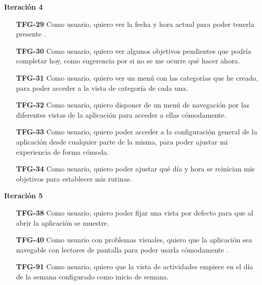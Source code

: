 \documentclass[10pt, a4paper]{aqademic}
\begin{document}
\textbf{Iteración 4}
\begin{itemize}[leftmargin=16mm]
	\item [\textbf{TFG-29}] Como usuario, quiero ver la fecha y hora actual para poder tenerla presente .

	\item [\textbf{TFG-30}] Como usuario, quiero ver algunos objetivos pendientes que podría completar hoy, como sugerencia por si no se me ocurre qué hacer ahora.
	
	\item [\textbf{TFG-31}] Como usuario, quiero ver un menú con las categorías que he creado, para poder acceder a la vista de categoría de cada una.
	
	\item [\textbf{TFG-32}] Como usuario, quiero disponer de un menú de navegación por las diferentes vistas de la aplicación para acceder a ellas cómodamente.
	
	\item [\textbf{TFG-33}] Como usuario, quiero poder acceder a la configuración general de la aplicación desde cualquier parte de la misma, para poder ajustar mi experiencia de forma cómoda.
	
	\item [\textbf{TFG-34}] Como usuario, quiero poder ajustar qué día y hora se reinician mis objetivos para establecer mis rutinas.
\end{itemize}

\textbf{Iteración 5}
\begin{itemize}[leftmargin=16mm]
	\item [\textbf{TFG-38}] Como usuario, quiero poder fijar una vista por defecto para que al abrir la aplicación se muestre.
	
	\item [\textbf{TFG-40}] Como usuario con problemas visuales, quiero que la aplicación sea navegable con lectores de pantalla para poder usarla cómodamente .
	
	\item [\textbf{TFG-91}] Como usuario, quiero que la vista de actividades empiece en el día de la semana configurado como inicio de semana.
\end{itemize}
\end{document}
